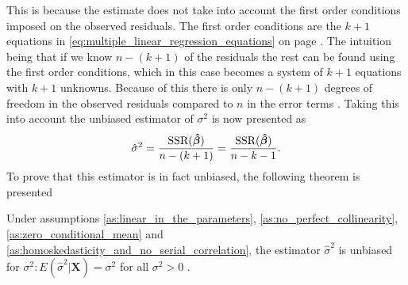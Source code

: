 This is because the estimate does not take into account the first order conditions imposed on the observed residuals.
The first order conditions are the $k + 1$ equations in \eqref{eq:multiple_linear_regression_equations} on page \pageref{eq:multiple_linear_regression_equations}.
The intuition being that if we know $n - (k + 1)$ of the residuals the rest can be found using the first order conditions, which in this case becomes a system of $k + 1$ equations with $k + 1$ unknowns. 
Because of this there is only $n - (k + 1)$ degrees of freedom in the observed residuals compared to $n$ in the error terms \cite[p. 55]{Wooldridge2012}.
Taking this into account the unbiased estimator of $\sigma^2$ is now presented as
\begin{align} \label{eq:sigma_hat_2_n-k-1}
    \hat{\sigma}^2 = \frac{\operatorname{\text{SSR}}(\operatorname{\boldsymbol{\hat{\beta}}})}{n - (k + 1)} = \frac{\operatorname{\text{SSR}}(\operatorname{\boldsymbol{\hat{\beta}}})}{n - k - 1}.
\end{align}
To prove that this estimator is in fact unbiased, the following theorem is presented
\begin{theorem}
    Under assumptions \ref{as:linear_in_the_parameters}, \ref{as:no_perfect_collinearity}, \ref{as:zero_conditional_mean} and \ref{as:homoskedasticity_and_no_serial_correlation}, the estimator $\hat{\sigma}^2$ is unbiased for $\sigma^2:E(\hat{\sigma}^2|\mathbf{X}) = \sigma^2$ for all $\sigma^2 > 0$ \cite[p. 813]{Wooldridge2012}.
\end{theorem}
